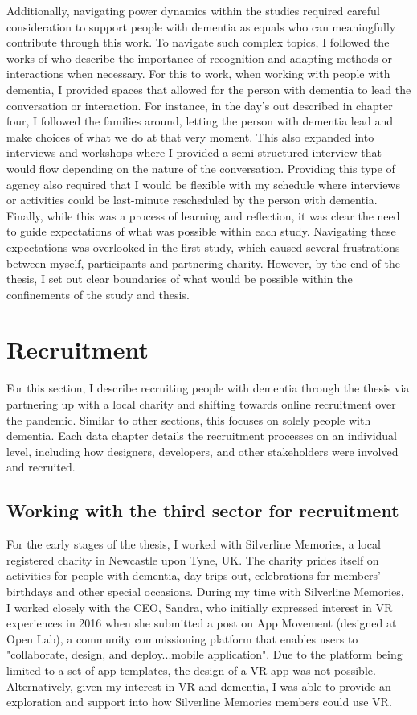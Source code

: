 Additionally, navigating power dynamics within the studies required careful consideration to support people with dementia as equals who can meaningfully contribute through this work. To navigate such complex topics, I followed the works of \cite{foley_struggle_2019,morrissey_value_2017, lazar_critical_2017} who describe the importance of recognition and adapting methods or interactions when necessary. For this to work, when working with people with dementia, I provided spaces that allowed for the person with dementia to lead the conversation or interaction. For instance, in the day's out described in chapter four, I followed the families around, letting the person with dementia lead and make choices of what we do at that very moment. This also expanded into interviews and workshops where I provided a semi-structured interview that would flow depending on the nature of the conversation. Providing this type of agency also required that I would be flexible with my schedule where interviews or activities could be last-minute rescheduled by the person with dementia. Finally, while this was a process of learning and reflection, it was clear the need to guide expectations of what was possible within each study. Navigating these expectations was overlooked in the first study, which caused several frustrations between myself, participants and partnering charity. However, by the end of the thesis, I set out clear boundaries of what would be possible within the confinements of the study and thesis.

\section{Recruitment}
\label{Method:Recruitment}
For this section, I describe recruiting people with dementia through the thesis via partnering up with a local charity and shifting towards online recruitment over the pandemic. Similar to other sections, this focuses on solely people with dementia. Each data chapter details the recruitment processes on an individual level, including how designers, developers, and other stakeholders were involved and recruited.

\subsection{Working with the third sector for recruitment}
\label{Method:ThirdSector}
For the early stages of the thesis, I worked with Silverline Memories, a local registered charity in Newcastle upon Tyne, UK. The charity prides itself on activities for people with dementia, day trips out, celebrations for members' birthdays and other special occasions. During my time with Silverline Memories, I worked closely with the CEO, Sandra, who initially expressed interest in VR experiences in 2016 when she submitted a post on App Movement (designed at Open Lab), a community commissioning platform that enables users to "collaborate, design, and deploy...mobile application". Due to the platform being limited to a set of app templates, the design of a VR app was not possible. Alternatively, given my interest in VR and dementia, I was able to provide an exploration and support into how Silverline Memories members could use VR. 

